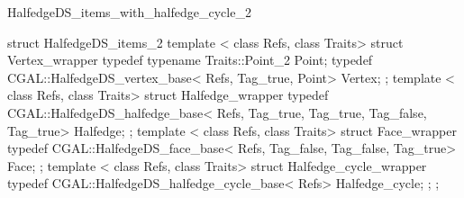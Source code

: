 \begin{ccRefClass}{HalfedgeDS_items_with_halfedge_cycle_2}
\begin{ccExampleCode}
struct HalfedgeDS_items_2 {
    template < class Refs, class Traits>
    struct Vertex_wrapper {
        typedef typename Traits::Point_2 Point;
        typedef CGAL::HalfedgeDS_vertex_base< Refs, Tag_true, Point> Vertex;
    };
    template < class Refs, class Traits>
    struct Halfedge_wrapper {
        typedef CGAL::HalfedgeDS_halfedge_base< Refs, Tag_true, Tag_true, Tag_false, Tag_true> Halfedge;
    };
    template < class Refs, class Traits>
    struct Face_wrapper {
        typedef CGAL::HalfedgeDS_face_base< Refs, Tag_false, Tag_false, Tag_true> Face;
    };
    template < class Refs, class Traits>
    struct Halfedge_cycle_wrapper {
        typedef CGAL::HalfedgeDS_halfedge_cycle_base< Refs> Halfedge_cycle;
    };
};
\end{ccExampleCode}


\end{ccRefClass}

\ccRefPageEnd

